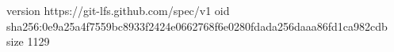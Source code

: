 version https://git-lfs.github.com/spec/v1
oid sha256:0e9a25a4f7559bc8933f2424e0662768f6e0280fdada256daaa86fd1ca982cdb
size 1129
